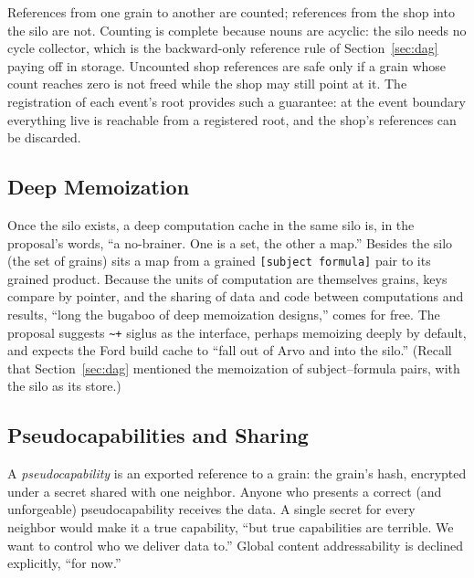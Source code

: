 \documentclass[twoside]{article}
\begin{document}
References from one grain to another are counted; references from the shop into the silo are not.  Counting is complete because nouns are acyclic:  the silo needs no cycle collector, which is the backward-only reference rule of Section~\ref{sec:dag} paying off in storage.  Uncounted shop references are safe only if a grain whose count reaches zero is not freed while the shop may still point at it.  The registration of each event's root provides such a guarantee:  at the event boundary everything live is reachable from a registered root, and the shop's references can be discarded.

\subsection{Deep Memoization}

Once the silo exists, a deep computation cache in the same silo is, in the proposal's words, ``a no-brainer.  One is a set, the other a map.''  Besides the silo (the set of grains) sits a map from a grained \texttt{[subject formula]} pair to its grained product.  Because the units of computation are themselves grains, keys compare by pointer, and the sharing of data and code between computations and results, ``long the bugaboo of deep memoization designs,'' comes for free.  The proposal suggests \lstinline[style=inlinecode]{~+} siglus as the interface, perhaps memoizing deeply by default, and expects the Ford build cache to ``fall out of Arvo and into the silo.''  (Recall that Section~\ref{sec:dag} mentioned the memoization of subject--formula pairs, with the silo as its store.)

\subsection{Pseudocapabilities and Sharing}

A \emph{pseudocapability} is an exported reference to a grain:  the grain's hash, encrypted under a secret shared with one neighbor.  Anyone who presents a correct (and unforgeable) pseudocapability receives the data.  A single secret for every neighbor would make it a true capability, ``but true capabilities are terrible.  We want to control who we deliver data to.''  Global content addressability is declined explicitly, ``for now.''
\end{document}
